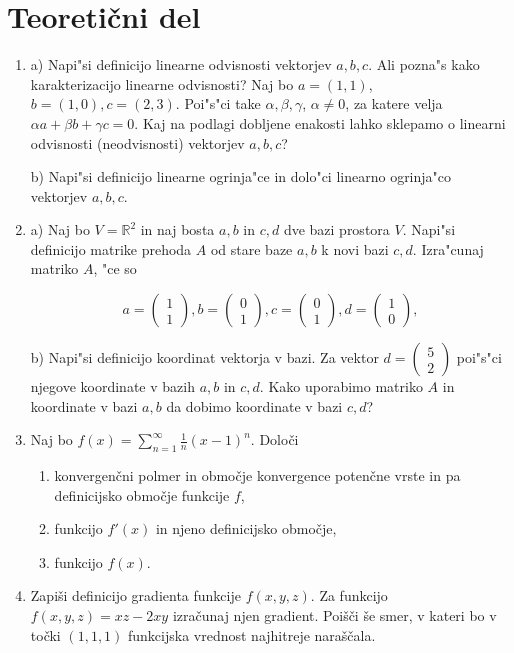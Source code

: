 \documentclass[a4paper,10pt]{article}
\begin{document}
\section*{Teoretični del}
\begin{enumerate}
\item a) Napi"si definicijo linearne odvisnosti vektorjev $a,b,c$. Ali
pozna"s kako karakterizacijo linearne odvisnosti? Naj bo $a=(1,1)$,
$b=(1,0), c=(2,3)$. Poi"s"ci take $\alpha, \beta,\gamma$, $\alpha\neq
0$, za katere velja $\alpha a+\beta b+\gamma c=0$. Kaj na podlagi
dobljene enakosti lahko sklepamo o linearni odvisnosti (neodvisnosti)
vektorjev $a,b,c$?


b) Napi"si definicijo linearne ogrinja"ce in dolo"ci linearno
ogrinja"co vektorjev $a,b,c$.


\item

a) Naj bo $V={\mathbb R}^2$ in naj bosta $a,b$ in $c,d$ dve bazi prostora $V$.
Napi"si definicijo matrike prehoda $A$ od stare baze $a,b$ k novi bazi
$c,d$. Izra"cunaj matriko $A$, "ce so

$$
a=\begin{pmatrix}1\\ 1\end{pmatrix}, b=\begin{pmatrix}0\\
1\end{pmatrix}, c=\begin{pmatrix}0\\
1\end{pmatrix},d=\begin{pmatrix}1\\ 0\end{pmatrix},
$$


b) Napi"si definicijo koordinat vektorja v bazi. Za vektor
$d=\begin{pmatrix}5\\ 2\end{pmatrix}$ poi"s"ci njegove koordinate v
bazih $a,b$ in $c,d$. Kako uporabimo matriko $A$ in koordinate v bazi
$a,b$ da dobimo koordinate v bazi $c,d$?

\item Naj bo ${f(x)=\displaystyle \sum_{n=1}^\infty \frac{1}{n}(x-1)^n}$. Dolo\v ci
\begin{enumerate}
\item konvergen\v cni polmer in obmo\v cje konvergence poten\v cne vrste in pa definicijsko obmo\v cje funkcije $f$,
\item funkcijo $f'(x)$ in njeno definicijsko obmo\v cje,
\item funkcijo $f(x)$.
\end{enumerate}

\item Zapi\v si definicijo gradienta funkcije $f(x,y,z)$. Za funkcijo $f(x,y,z)=xz-2xy$ izra\v cunaj njen gradient. Poi\v s\v ci \v se smer, v kateri bo v to\v cki $(1,1,1)$ funkcijska vrednost najhitreje nara\v s\v cala.



\end{enumerate}
\end{document}
